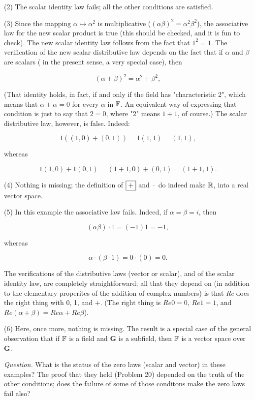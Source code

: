 (2) The scalar identity law fails; all the other conditions are satisfied.

(3) Since the mapping $\alpha \mapsto \alpha^2$ is multiplicative ($(\alpha\beta)^2 = \alpha^2 \beta^2$), the associative law for the new scalar product is true (this should be checked, and it is fun to check). The new scalar identity law follows from the fact that $1^2 = 1$. The verification of the new scalar distributive law depends on the fact that if $\alpha$ and $\beta$ are scalars ( in the present sense, a very special case), then

\begin{equation}
    (\alpha + \beta)^2 =  \alpha^2 + \beta^2,
\end{equation}

(That identity holds, in fact, if and only if the field has "characteristic 2", which means that $\alpha + \alpha = 0$ for every $\alpha$ in $\mathbb{F}$. An equivalent way of expressing that condition is just to say that $2 = 0$, where "$2$" means $1+1$, of course.) The scalar distributive law, however, is false. Indeed:

\begin{equation}
    1((1,0) + (0,1)) = 1(1,1) = (1,1),
\end{equation}

whereas

\begin{equation}
    1(1,0) + 1(0,1) = (1+1,0) + (0,1) = (1+1,1).
\end{equation}

(4) Nothing is missing; the definition of $\boxed{ + }$ and $\boxed{\cdot}$ do indeed make $\mathbb{R}$, into a real vector space.

(5) In this example the associative law fails. Indeed, if $\alpha = \beta = i$, then

\begin{equation}
    (\alpha\beta)\cdot 1 = (-1)1 = -1,
\end{equation}

whereas

\begin{equation}
    \alpha \cdot (\beta \cdot 1) = 0 \cdot (0) = 0.
\end{equation}

The verifications of the distributive laws (vector or scalar), and of the scalar identity law, are completely straightforward; all that they depend on (in addition to the elementary properites of the addition of complex numbers) is that \textit{Re} does the right thing with 0, 1, and $+$. (The right thing is $\textit{Re}0 = 0$, $\textit{Re}1=1$, and $\textit{Re}(\alpha+\beta) = \textit{Re} \alpha + \textit{Re}\beta$).

(6) Here, once more, nothing is missing. The result is a special case of the general observation that if $\mathbb{F}$ is a field and $\mathbf{G}$ is a subfield, then $\mathbb{F}$ is a vector space over $\mathbf{G}$.

\textit{Question.} What is the status of the zero laws (scalar and vector) in these examples? The proof that they held (Problem 20) depended on the truth of the other conditions; does the failure of some of those conditons make the zero laws fail also?